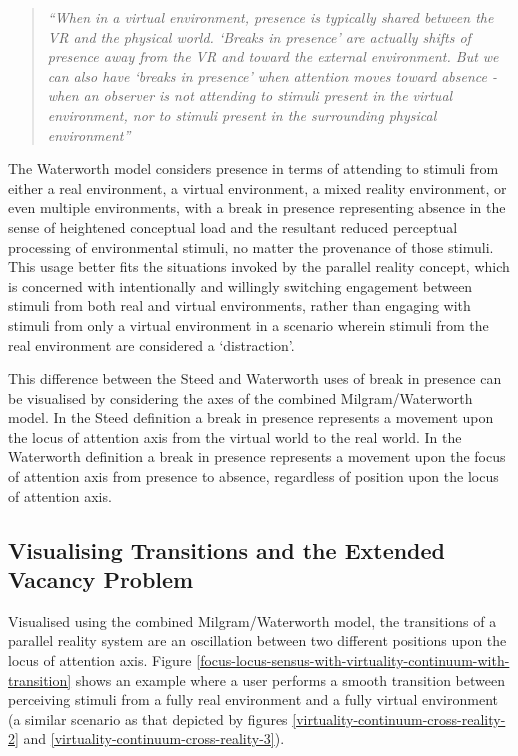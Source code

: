 \begin{quote}
	\textit{``When in a virtual environment, presence is typically shared between the VR and the physical world. `Breaks in presence' are actually shifts of presence away from the VR and toward the external environment. But we can also have `breaks in presence' when attention moves toward absence - when an observer is not attending to stimuli present in the virtual environment, nor to stimuli present in the surrounding physical environment''}~\cite{Waterworth2001}
\end{quote}

The Waterworth model considers presence in terms of attending to stimuli from either a real environment, a virtual environment, a mixed reality environment, or even multiple environments, with a break in presence representing absence in the sense of heightened conceptual load and the resultant reduced perceptual processing of environmental stimuli, no matter the provenance of those stimuli. This usage better fits the situations invoked by the parallel reality concept, which is concerned with intentionally and willingly switching engagement between stimuli from both real and virtual environments, rather than engaging with stimuli from only a virtual environment in a scenario wherein stimuli from the real environment are considered a `distraction'.

This difference between the Steed and Waterworth uses of break in presence can be visualised by considering the axes of the combined Milgram/Waterworth model. In the Steed definition a break in presence represents a movement upon the locus of attention axis from the virtual world to the real world. In the Waterworth definition a break in presence represents a movement upon the focus of attention axis from presence to absence, regardless of position upon the locus of attention axis.


\subsection{Visualising Transitions and the Extended Vacancy Problem}
\label{visualising-transitions-extended-vacancy}
Visualised using the combined Milgram/Waterworth model, the transitions of a parallel reality system are an oscillation between two different positions upon the locus of attention axis. Figure \ref{focus-locus-sensus-with-virtuality-continuum-with-transition} shows an example where a user performs a smooth transition between perceiving stimuli from a fully real environment and a fully virtual environment (a similar scenario as that depicted by figures \ref{virtuality-continuum-cross-reality-2} and \ref{virtuality-continuum-cross-reality-3}).

